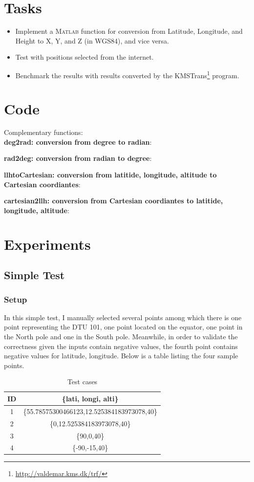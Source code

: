 \section{Tasks}
\begin{itemize}
	\item Implement a \textsc{Matlab} function for conversion from Latitude, Longitude, and Height to X, Y, and Z (in WGS84), and vice versa.
	\item Test with positions selected from the internet.
	\item Benchmark the results with results converted by the KMSTrans\footnote{\url{http://valdemar.kms.dk/trf/}} program.
\end{itemize}
\section{Code}
Complementary functions: \\
\textbf{deg2rad: conversion from degree to radian}:

\textbf{rad2deg: conversion from radian to degree}:

\textbf{llhtoCartesian: conversion from latitide, longitude, altitude to Cartesian coordiantes}:

\textbf{cartesian2llh: conversion from Cartesian coordiantes to latitide, longitude, altitude}:

\newpage


\section{Experiments}
\subsection{Simple Test}
\subsubsection{Setup}
In this simple test, I manually selected several points among which there is one point representing the DTU 101, one point located on the equator, one point in the North pole and one in the South pole. Meanwhile, in order to validate the correctness given the inputs contain negative values, the fourth point contains negative values for latitude, longitude. Below is a table listing the four sample points.
\begin{table}[h]
	\centering
	\caption{Test cases}
	\label{tb1:test_cases}
	\begin{tabular}{c|c}
		\hline
		\textbf{ID} & \textbf{\{lati, longi, alti\}} \\ \hline
		1     &  \{55.78575300466123,12.525384183973078,40\}   \\ \hline
		2     & \{0,12.525384183973078,40\}     \\ \hline
		3 	  & \{90,0,40\} \\ \hline
		4	  & \{-90,-15,40\} \\ \hline
	\end{tabular}
\end{table}
